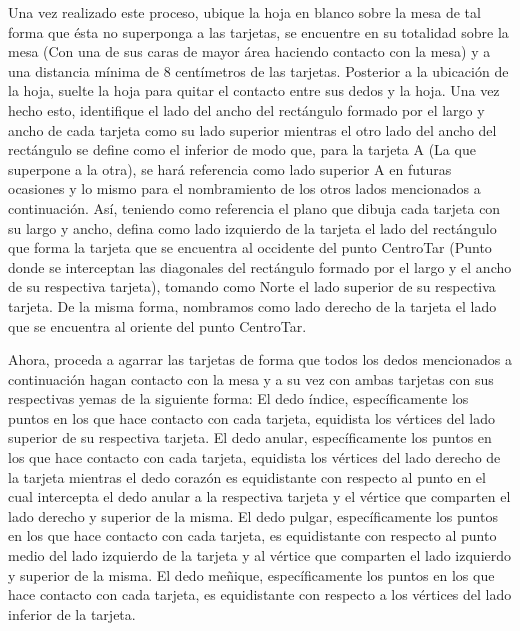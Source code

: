 \documentclass{article}
\begin{document}
Una vez realizado este proceso, ubique la hoja en blanco sobre la mesa de tal forma que ésta no superponga a las tarjetas, se encuentre en su totalidad sobre la mesa (Con una de sus caras de mayor área haciendo contacto con la mesa) y a una distancia mínima de 8 centímetros de las tarjetas. Posterior a la ubicación de la hoja, suelte la hoja para quitar el contacto entre sus dedos y la hoja. Una vez hecho esto, identifique el lado del ancho del rectángulo formado por el largo y ancho de cada tarjeta como su lado superior mientras el otro lado del ancho del rectángulo se define como el inferior de modo que, para la tarjeta A (La que superpone a la otra), se hará referencia como lado superior A en futuras ocasiones y lo mismo para el nombramiento de los otros lados mencionados a continuación. Así, teniendo como referencia el plano que dibuja cada tarjeta con su largo y ancho, defina como lado izquierdo de la tarjeta el lado del rectángulo que forma la tarjeta que se encuentra al occidente del punto CentroTar (Punto donde se interceptan las diagonales del rectángulo formado por el largo y el ancho de su respectiva tarjeta), tomando como Norte el lado superior de su respectiva tarjeta. De la misma forma, nombramos como lado derecho de la tarjeta el lado que se encuentra al oriente del punto CentroTar.

Ahora, proceda a agarrar las tarjetas de forma que todos los dedos mencionados a continuación hagan contacto con la mesa y a su vez con ambas tarjetas con sus respectivas yemas de la siguiente forma:
El dedo índice, específicamente los puntos en los que hace contacto con cada tarjeta, equidista los vértices del lado superior de su respectiva tarjeta.
El dedo anular, específicamente los puntos en los que hace contacto con cada tarjeta, equidista los vértices del lado derecho de la tarjeta mientras el dedo corazón es equidistante con respecto al punto en el cual intercepta el dedo anular a la respectiva tarjeta y el vértice que comparten el lado derecho y superior de la misma.
El dedo pulgar, específicamente los puntos en los que hace contacto con cada tarjeta, es equidistante con respecto al punto medio del lado izquierdo de la tarjeta y al vértice que comparten el lado izquierdo y superior de la misma.
El dedo meñique, específicamente los puntos en los que hace contacto con cada tarjeta, es equidistante con respecto a los vértices del lado inferior de la tarjeta.
\end{document}
